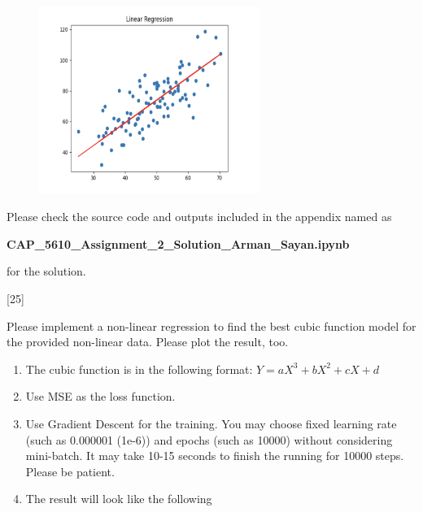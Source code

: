 \documentclass[12pt,letterpaper, onecolumn]{exam}
\begin{document}
\begin{questions}
    \begin{figure}[h]
        \centering
        \includegraphics[width=0.64\textwidth]{linear.png}
    \end{figure}

    \begin{solution}

        Please check the source code and outputs included in the appendix named as

        \begin{center}
            \textbf{CAP\_5610\_Assignment\_2\_Solution\_Arman\_Sayan.ipynb}
        \end{center}
        
        for the solution.
    \end{solution}

    \pagebreak

    [25]

    Please implement a non-linear regression to find the best cubic function model for the 
    provided non-linear data. Please plot the result, too.

    \begin{enumerate}[label=(\arabic*)]
        \item The cubic function is in the following format: $Y=aX^3+bX^2+cX+d$
        \item Use MSE as the loss function.
        \item Use Gradient Descent for the training. You may choose fixed learning rate (such as
        0.000001 (1e-6)) and epochs (such as 10000) without considering mini-batch. It may take
        10-15 seconds to finish the running for 10000 steps. Please be patient.
        \item The result will look like the following
    \end{enumerate}


\end{questions}
\end{document}
